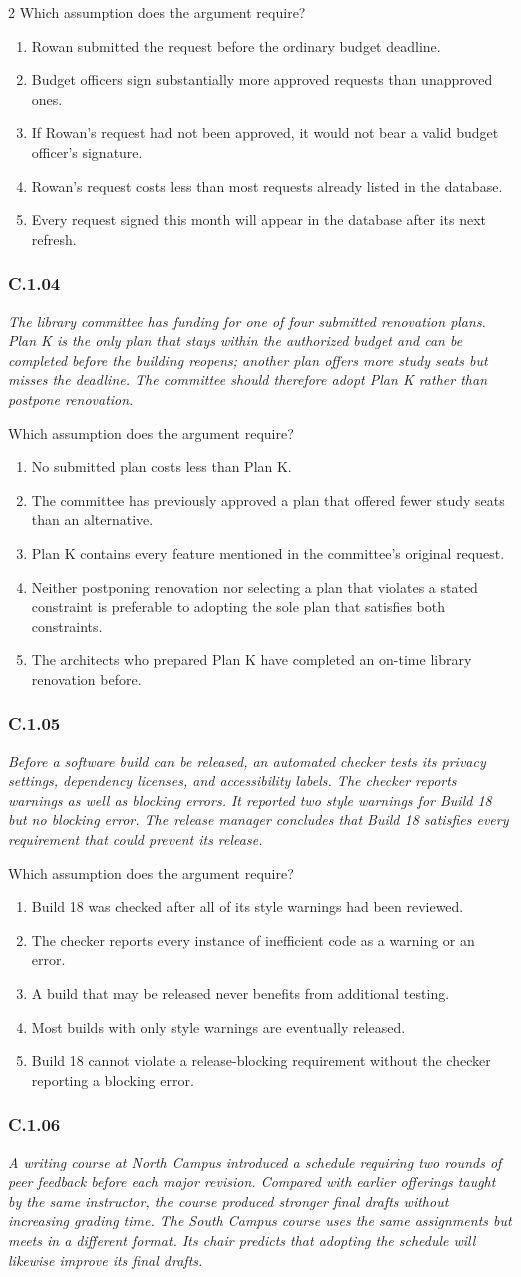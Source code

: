 \documentclass[10pt]{extarticle}
\newcommand{\choice}[1]{\item #1}
\newcommand{\bankitem}[1]{\subsubsection*{#1}}
\begin{document}
\begin{multicols}{2}
Which assumption does the argument require?
\begin{enumerate}[label=(\alph*)]
  \choice{Rowan submitted the request before the ordinary budget deadline.}
  \choice{Budget officers sign substantially more approved requests than unapproved ones.}
  \choice{If Rowan's request had not been approved, it would not bear a valid budget officer's signature.}
  \choice{Rowan's request costs less than most requests already listed in the database.}
  \choice{Every request signed this month will appear in the database after its next refresh.}
\end{enumerate}
\bankitem{C.1.04}
\emph{The library committee has funding for one of four submitted renovation plans. Plan K is the only plan that stays within the authorized budget and can be completed before the building reopens; another plan offers more study seats but misses the deadline. The committee should therefore adopt Plan K rather than postpone renovation.}

Which assumption does the argument require?
\begin{enumerate}[label=(\alph*)]
  \choice{No submitted plan costs less than Plan K.}
  \choice{The committee has previously approved a plan that offered fewer study seats than an alternative.}
  \choice{Plan K contains every feature mentioned in the committee's original request.}
  \choice{Neither postponing renovation nor selecting a plan that violates a stated constraint is preferable to adopting the sole plan that satisfies both constraints.}
  \choice{The architects who prepared Plan K have completed an on-time library renovation before.}
\end{enumerate}
\bankitem{C.1.05}
\emph{Before a software build can be released, an automated checker tests its privacy settings, dependency licenses, and accessibility labels. The checker reports warnings as well as blocking errors. It reported two style warnings for Build 18 but no blocking error. The release manager concludes that Build 18 satisfies every requirement that could prevent its release.}

Which assumption does the argument require?
\begin{enumerate}[label=(\alph*)]
  \choice{Build 18 was checked after all of its style warnings had been reviewed.}
  \choice{The checker reports every instance of inefficient code as a warning or an error.}
  \choice{A build that may be released never benefits from additional testing.}
  \choice{Most builds with only style warnings are eventually released.}
  \choice{Build 18 cannot violate a release-blocking requirement without the checker reporting a blocking error.}
\end{enumerate}
\bankitem{C.1.06}
\emph{A writing course at North Campus introduced a schedule requiring two rounds of peer feedback before each major revision. Compared with earlier offerings taught by the same instructor, the course produced stronger final drafts without increasing grading time. The South Campus course uses the same assignments but meets in a different format. Its chair predicts that adopting the schedule will likewise improve its final drafts.}


\end{multicols}
\end{document}
